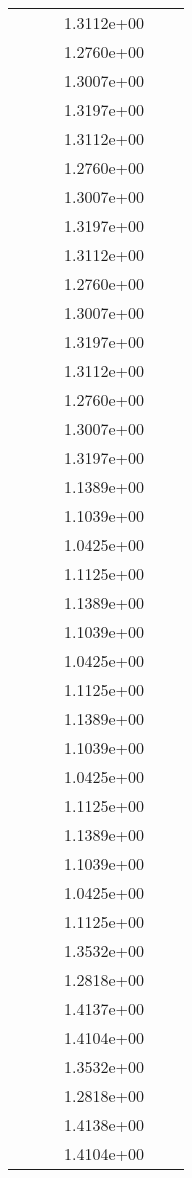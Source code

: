 \begin{xltabular}{\textwidth}{r|rS[table-format=1.3e+2]S[table-format=1.4e+2]S[table-format=1.4e+2]S[table-format=-1.5]}
&  &  & 1.3112e+00 & & \\
&  &  & 1.2760e+00 & & \\
&  &  & 1.3007e+00 & & \\
&  &  & 1.3197e+00 & & \\
&  &  & 1.3112e+00 & & \\
&  &  & 1.2760e+00 & & \\
&  &  & 1.3007e+00 & & \\
&  &  & 1.3197e+00 & & \\
&  &  & 1.3112e+00 & & \\
&  &  & 1.2760e+00 & & \\
&  &  & 1.3007e+00 & & \\
&  &  & 1.3197e+00 & & \\
&  &  & 1.3112e+00 & & \\
&  &  & 1.2760e+00 & & \\
&  &  & 1.3007e+00 & & \\
&  &  & 1.3197e+00 & & \\
&  &  & 1.1389e+00 & & \\
&  &  & 1.1039e+00 & & \\
&  &  & 1.0425e+00 & & \\
&  &  & 1.1125e+00 & & \\
&  &  & 1.1389e+00 & & \\
&  &  & 1.1039e+00 & & \\
&  &  & 1.0425e+00 & & \\
&  &  & 1.1125e+00 & & \\
&  &  & 1.1389e+00 & & \\
&  &  & 1.1039e+00 & & \\
&  &  & 1.0425e+00 & & \\
&  &  & 1.1125e+00 & & \\
&  &  & 1.1389e+00 & & \\
&  &  & 1.1039e+00 & & \\
&  &  & 1.0425e+00 & & \\
&  &  & 1.1125e+00 & & \\
&  &  & 1.3532e+00 & & \\
&  &  & 1.2818e+00 & & \\
&  &  & 1.4137e+00 & & \\
&  &  & 1.4104e+00 & & \\
&  &  & 1.3532e+00 & & \\
&  &  & 1.2818e+00 & & \\
&  &  & 1.4138e+00 & & \\
&  &  & 1.4104e+00 & & \\

\end{xltabular}
